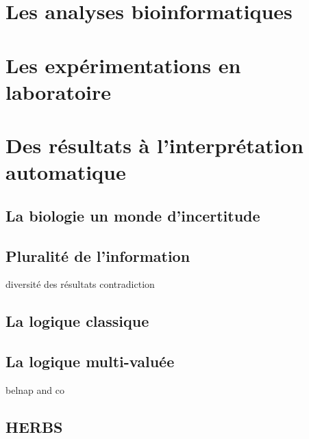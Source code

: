 \section{Les analyses bioinformatiques}
\section{Les expérimentations en laboratoire}

\section{Des résultats à l'interprétation automatique}
\subsection{La biologie un monde d'incertitude}
\subsection{Pluralité de l'information}
diversité des résultats contradiction
\subsection{La logique classique}
\subsection{La logique multi-valuée}
belnap and co
\subsection{HERBS}
